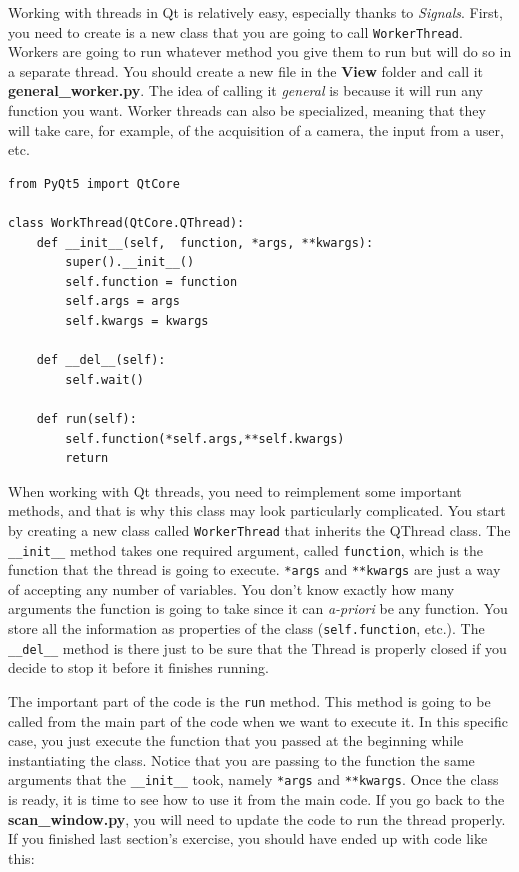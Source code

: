 Working with threads in Qt is relatively easy, especially thanks to
\emph{Signals}. First, you need to create is a new class that you are
going to call \texttt{WorkerThread}. Workers are going to run whatever
method you give them to run but will do so in a separate thread. You
should create a new file in the \textbf{View} folder and call it
\textbf{general\_worker.py}. The idea of calling it \emph{general} is
because it will run any function you want. Worker threads can also be
specialized, meaning that they will take care, for example, of the
acquisition of a camera, the input from a user, etc.

\begin{verbatim}
from PyQt5 import QtCore

class WorkThread(QtCore.QThread):
    def __init__(self,  function, *args, **kwargs):
        super().__init__()
        self.function = function
        self.args = args
        self.kwargs = kwargs

    def __del__(self):
        self.wait()

    def run(self):
        self.function(*self.args,**self.kwargs)
        return
\end{verbatim}

When working with Qt threads, you need to reimplement some important
methods, and that is why this class may look particularly complicated.
You start by creating a new class called \texttt{WorkerThread} that
inherits the QThread class. The \texttt{__init__} method takes one
required argument, called \texttt{function}, which is the function that
the thread is going to execute. \texttt{*args} and \texttt{**kwargs} are
just a way of accepting any number of variables. You don't know exactly
how many arguments the function is going to take since it can
\emph{a-priori} be any function. You store all the information as
properties of the class (\texttt{self.function}, etc.). The
\texttt{__del__} method is there just to be sure that the Thread is
properly closed if you decide to stop it before it finishes running.

The important part of the code is the \texttt{run} method. This method
is going to be called from the main part of the code when we want to
execute it. In this specific case, you just execute the function that
you passed at the beginning while instantiating the class. Notice that
you are passing to the function the same arguments that the
\texttt{__init__} took, namely \texttt{*args} and \texttt{**kwargs}.
Once the class is ready, it is time to see how to use it from the main
code. If you go back to the \textbf{scan\_window.py}, you will need to
update the code to run the thread properly. If you finished last
section's exercise, you should have ended up with code like this:

